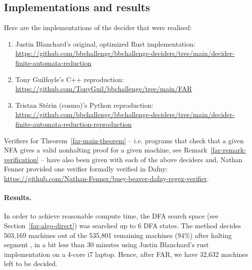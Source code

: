 




\subsection{Implementations and results}\label{sec:far-implem}

Here are the implementations of the decider that were realised:

\begin{enumerate}
  \item Justin Blanchard's original, optimized Rust implementation: \url{https://github.com/bbchallenge/bbchallenge-deciders/tree/main/decider-finite-automata-reduction}
  \item Tony Guilfoyle's C++ reproduction: \url{https://github.com/TonyGuil/bbchallenge/tree/main/FAR}
  \item Tristan Stérin (cosmo)'s Python reproduction: \url{https://github.com/bbchallenge/bbchallenge-deciders/tree/main/decider-finite-automata-reduction-reproduction}
\end{enumerate}


Verifiers for Theorem~\ref{far-main-theorem} -- i.e. programs that check that a given NFA gives a valid nonhalting proof for a given machine, see Remark~\ref{far-remark-verification} -- have also been given with each of the above deciders and, Nathan Fenner provided one verifier formally verified in Dafny: \url{https://github.com/Nathan-Fenner/busy-beaver-dafny-regex-verifier}.


\paragraph*{Results.} In order to achieve reasonable compute time, the DFA search space (see Section~\ref{far-algo-direct}) was searched up to 6 DFA states. The method decides 503,169 machines out of the 535,801 remaining machines (94\%) after halting segment , in a bit less than 30 minutes using Justin Blanchard's rust implementation on a 4-core i7 laptop. Hence, after FAR, we have 32,632 machines left to be decided.
